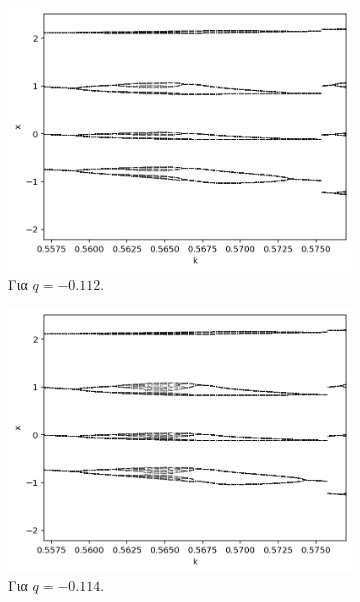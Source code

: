 \begin{figure}[h!]
	\centering

	\begin{subfigure}[b]{0.4\textwidth}
		\centering
		\includegraphics[width=\textwidth]{LateX images/graphs/g2}
		\caption{Για $q=-0.112$.}
		\label{f:g3}
	\end{subfigure}
	\hfill
	\begin{subfigure}[b]{0.4\textwidth}
		\centering
		\includegraphics[width=\textwidth]{LateX images/graphs/g3}
		\caption{Για $q=-0.114$.}
		\label{f:g4}
	\end{subfigure}
	\hfill
	\begin{subfigure}[b]{0.4\textwidth}
		\centering

\end{subfigure}
\end{figure}
